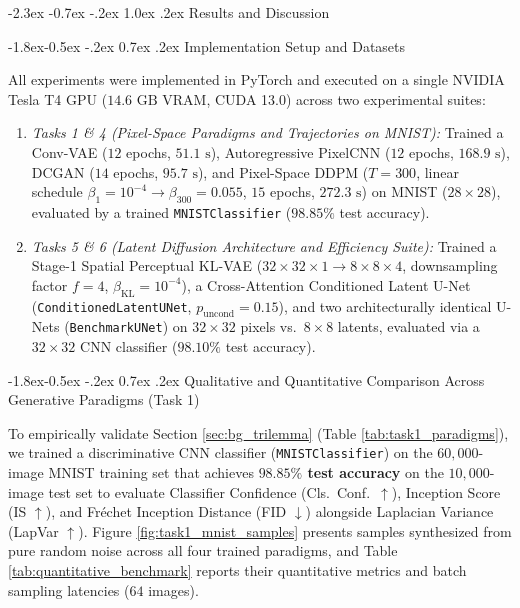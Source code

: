 \documentclass[10pt,a4paper]{article}
\makeatletter
\renewcommand\section{\@startsection {section}{1}{\z@}%
                                   {-2.3ex \@plus -0.7ex \@minus -.2ex}%
                                   {1.0ex \@plus.2ex}%
                                   {\normalfont\large\bfseries}}
\renewcommand\subsection{\@startsection{subsection}{2}{\z@}%
                                     {-1.8ex\@plus -0.5ex \@minus -.2ex}%
                                     {0.7ex \@plus .2ex}%
                                     {\normalfont\normalsize\bfseries}}
\makeatother
\begin{document}
\section{Results and Discussion}

\subsection{Implementation Setup and Datasets}
\label{sec:res_setup}

All experiments were implemented in PyTorch and executed on a single NVIDIA Tesla T4 GPU ($14.6\text{ GB}$ VRAM, CUDA 13.0) across two experimental suites:
\begin{enumerate}[leftmargin=1.8em, itemsep=0.12em, topsep=0.2em]
    \item \textit{Tasks 1 \& 4 (Pixel-Space Paradigms and Trajectories on MNIST):} Trained a Conv-VAE ($12$ epochs, $51.1\text{ s}$), Autoregressive PixelCNN ($12$ epochs, $168.9\text{ s}$), DCGAN ($14$ epochs, $95.7\text{ s}$), and Pixel-Space DDPM ($T=300$, linear schedule $\beta_1=10^{-4} \to \beta_{300}=0.055$, $15$ epochs, $272.3\text{ s}$) on MNIST ($28 \times 28$), evaluated by a trained \texttt{MNISTClassifier} ($98.85\%$ test accuracy).
    \item \textit{Tasks 5 \& 6 (Latent Diffusion Architecture and Efficiency Suite):} Trained a Stage-1 Spatial Perceptual KL-VAE ($32 \times 32 \times 1 \to 8 \times 8 \times 4$, downsampling factor $f=4$, $\beta_{\text{KL}}=10^{-4}$), a Cross-Attention Conditioned Latent U-Net (\texttt{ConditionedLatentUNet}, $p_{\text{uncond}}=0.15$), and two architecturally identical U-Nets (\texttt{BenchmarkUNet}) on $32 \times 32$ pixels vs.\ $8 \times 8$ latents, evaluated via a $32\times 32$ CNN classifier ($98.10\%$ test accuracy).
\end{enumerate}

\subsection{Qualitative and Quantitative Comparison Across Generative Paradigms (Task 1)}
\label{sec:res_task1}

To empirically validate Section \ref{sec:bg_trilemma} (Table \ref{tab:task1_paradigms}), we trained a discriminative CNN classifier (\texttt{MNISTClassifier}) on the $60{,}000$-image MNIST training set that achieves \textbf{$98.85\%$ test accuracy} on the $10{,}000$-image test set to evaluate Classifier Confidence (Cls.\ Conf.\ $\uparrow$), Inception Score (IS $\uparrow$), and Fr\'echet Inception Distance (FID $\downarrow$) alongside Laplacian Variance (LapVar $\uparrow$). Figure \ref{fig:task1_mnist_samples} presents samples synthesized from pure random noise across all four trained paradigms, and Table \ref{tab:quantitative_benchmark} reports their quantitative metrics and batch sampling latencies ($64$ images).
\end{document}
